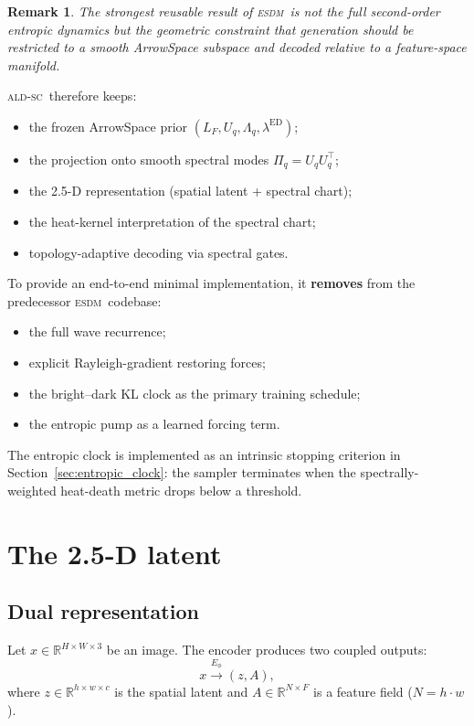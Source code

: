 \documentclass[11pt]{article}
\newtheorem{remark}{Remark}
\newcommand{\ESDM}{\textsc{esdm}}
\newcommand{\ALDSC}{\textsc{ald-sc}}
\newcommand{\Lf}{L_F}
\newcommand{\Uq}{U_q}
\newcommand{\Lq}{\Lambda_q}
\newcommand{\ed}{\lambda^{\mathrm{ED}}}
\newcommand{\R}{\mathbb{R}}
\begin{document}
    \begin{remark}
    The strongest reusable result of \ESDM~is not the full
    second-order entropic dynamics but the geometric constraint that
    generation should be restricted to a smooth ArrowSpace subspace
    and decoded relative to a feature-space manifold.
    \end{remark}

    \ALDSC~therefore keeps:
    \begin{itemize}[leftmargin=1.5em]
    \item the frozen ArrowSpace prior $(\Lf,\Uq,\Lq,\ed)$;
    \item the projection onto smooth spectral modes $\Pi_q = \Uq\Uq^\top$;
    \item the 2.5-D representation (spatial latent + spectral chart);
    \item the heat-kernel interpretation of the spectral chart;
    \item topology-adaptive decoding via spectral gates.
    \end{itemize}

    To provide an end-to-end minimal implementation, it \textbf{removes} from the predecessor \ESDM~codebase:
    \begin{itemize}[leftmargin=1.5em]
    \item the full wave recurrence;
    \item explicit Rayleigh-gradient restoring forces;
    \item the bright--dark KL clock as the primary training schedule;
    \item the entropic pump as a learned forcing term.
    \end{itemize}

    The entropic clock is implemented as an intrinsic stopping criterion
    in Section~\ref{sec:entropic_clock}: the sampler terminates when
    the spectrally-weighted heat-death metric drops below a threshold.

    \section{The 2.5-D latent}
    \label{sec:25d}

    \subsection{Dual representation}
    \label{sec:dual_representation}
    Let $x \in \R^{H \times W \times 3}$ be an image. The encoder
    produces two coupled outputs:
    \[x \xrightarrow{E_\phi} (z, A),\]
    where $z \in \R^{h \times w \times c}$ is the spatial latent and
    $A \in \R^{N \times F}$ is a feature field ($N = h \cdot w$).
\end{document}
